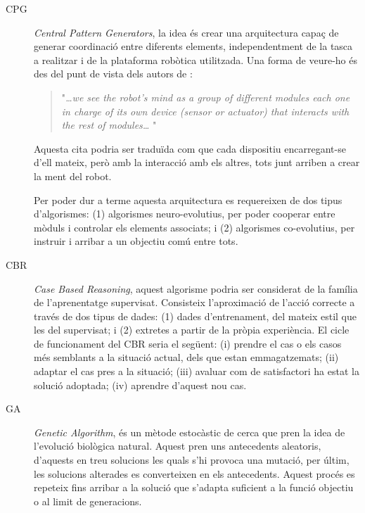 \documentclass[12pt,a4paper,final,twoside]{article}
\begin{document}
\begin{description}

\item[CPG] \textit{Central Pattern Generators}, la idea és crear una arquitectura capaç de generar coordinació entre diferents elements, independentment de la tasca a realitzar i de la plataforma robòtica utilitzada. Una forma de veure-ho és des del punt de vista dels autors de \cite{Tellez2005a}:
\begin{quotation}
"\textit{\dots we see the robot’s mind as a group of different modules each one in charge of its own device (sensor or actuator) that interacts with the rest of modules\dots} "
\end{quotation}

Aquesta cita podria ser traduïda com que cada dispositiu encarregant-se d'ell mateix, però amb la interacció amb els altres, tots junt arriben a crear la ment del robot.

Per poder dur a terme aquesta arquitectura es requereixen de dos tipus d'algorismes: (1) algorismes neuro-evolutius, per poder cooperar entre mòduls i controlar els elements associats; i (2) algorismes co-evolutius, per instruir i arribar a un objectiu comú entre tots.


\item[CBR] \textit{Case Based Reasoning}, aquest algorisme podria ser considerat de la família de l'aprenentatge supervisat. Consisteix l'aproximació de l'acció correcte a través de dos tipus de dades: (1) dades d'entrenament, del mateix estil que les del supervisat; i (2) extretes a partir de la pròpia experiència. El cicle de funcionament del CBR seria el següent: (i) prendre el cas o els casos més semblants a la situació actual, dels que estan emmagatzemats; (ii) adaptar el cas pres a la situació; (iii) avaluar com de satisfactori ha estat la solució adoptada; (iv) aprendre d'aquest nou cas.

\item[GA] \textit{Genetic Algorithm}, és un mètode estocàstic de cerca que pren la idea de l'evolució biològica natural. Aquest pren uns antecedents aleatoris, d'aquests en treu solucions les quals s'hi provoca una mutació, per últim, les solucions alterades es converteixen en els antecedents. Aquest procés es repeteix fins arribar a la solució que s'adapta suficient a la funció objectiu o al limit de generacions.

\end{description}
\end{document}
